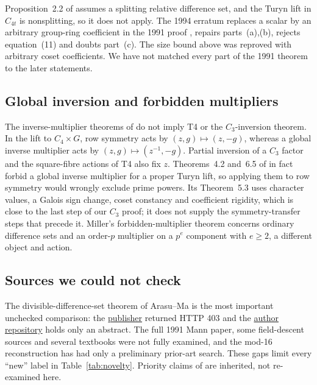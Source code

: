 \documentclass[11pt]{article}
\theoremstyle{definition}
\theoremstyle{remark}
\begin{document}
Proposition~2.2 of \cite{AJMP95} assumes a splitting relative difference
set, and the Turyn lift in $C_{4t}$ is nonsplitting, so it does not apply.
The 1994 erratum \cite{AJP94} replaces a scalar by an arbitrary group-ring
coefficient in the 1991 proof \cite{AJP91}, repairs parts~(a),(b), rejects
equation~(11) and doubts part~(c). The size bound above was reproved with
arbitrary coset coefficients. We have not matched every part of the 1991
theorem to the later statements.

\subsection{Global inversion and forbidden multipliers}\label{sec:inversion}
The inverse-multiplier theorems of \cite{AJP90} do not imply T4 or the
$C_3$-inversion theorem. In the lift to $C_4\times G$, row symmetry acts by
$(z,g)\mapsto(z,-g)$, whereas a global inverse multiplier acts by
$(z,g)\mapsto(z^{-1},-g)$. Partial inversion of a $C_3$ factor and the
square-fibre actions of T4 also fix $z$. Theorems~4.2 and~6.5 of
\cite{AJP90} in fact forbid a global inverse multiplier for a proper Turyn
lift, so applying them to row symmetry would wrongly exclude prime powers.
Its Theorem~5.3 uses character values, a Galois sign change, coset constancy
and coefficient rigidity, which is close to the last step of our $C_3$
proof; it does not supply the symmetry-transfer steps that precede it.
Miller's forbidden-multiplier theorem \cite{Miller25} concerns ordinary
difference sets and an order-$p$ multiplier on a $p^e$ component with
$e\ge2$, a different object and action.

\subsection{Sources we could not check}
The divisible-difference-set theorem of Arasu--Ma \cite{AM01} is the most
important unchecked comparison: the
\href{https://www.sciencedirect.com/science/article/pii/S0378375800002780}{publisher}
returned HTTP 403 and the
\href{https://corescholar.libraries.wright.edu/math/564/}{author repository}
holds only an abstract. The full 1991 Mann paper, some field-descent sources
and several textbooks were not fully examined, and the mod-16 reconstruction
has had only a preliminary prior-art search. These gaps limit every ``new'' label in Table~\ref{tab:novelty}. Priority
claims of \cite{Kline26} are inherited, not re-examined here.

\end{document}

